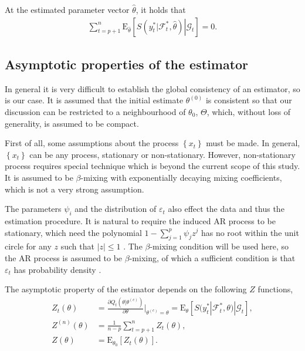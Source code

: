 \documentclass[a4paper,12pt]{article}
\newcommand{\E}{\mathop{\mathbb{E}}}
\def \E{\mbox{E}}
\def \F {\mathcal{F}}
\def \G {\mathcal{G}}
\begin{document}
At the estimated parameter vector $\hat{\theta}$, it holds that
\begin{align}
\sum_{t=p+1}^n \E_{\hat{\theta}}\left[ \left. S(y_t^*|\F_t^*,\hat{\theta}) \right|\G_t \right]= 0.
\label{hatEqn}
\end{align}

\subsection{Asymptotic properties of the estimator}
In general it is very difficult to establish the global consistency of an estimator, so is our case. It is assumed that the initial estimate $\theta^{(0)}$ is consistent so that our discussion can be restricted to a neighbourhood of $\theta_0$, $\Theta$, which, without loss of generality, is assumed to be compact.

First of all, some assumptions about the process $\left\{ x_t \right\}$ must be made. In general, $\left\{ x_t \right\}$ can be any process, stationary or non-stationary. However, non-stationary process requires special technique which is beyond the current scope of this study. It is assumed to be $\beta$-mixing with exponentially decaying mixing coefficients, which is not a very strong assumption.

The parameters $\psi_i$ and the distribution of $\varepsilon_t$ also effect the data and thus the estimation procedure. It is natural to require the induced AR process to be stationary, which need the polynomial $1-\sum_{j=1}^p \psi_jz^j$ has no root within the unit circle for any $z$ such that $|z|\le 1$ \citep{FanYao2003}. The $\beta$-mixing condition will be used here, so the AR process is assumed to be $\beta$-mixing, of which a sufficient condition is that $\varepsilon_t$ has probability density \citep{PhamTran1985}.

The asymptotic property of the estimator depends on the following $Z$ functions,
\begin{align*}
Z_t(\theta) &= \frac{\partial Q_t(\theta|\theta^{(c)})}{\partial \theta}|_{\theta^{(c)}=\theta} =
\E_{\theta}\left[ S(y_t^*|\F_t^*,\theta)|\G_t \right],\\
Z^{(n)}(\theta) &= \frac{1}{n-p}\sum_{t=p+1}^n Z_t(\theta),\\
Z(\theta) &= \E_{\theta_0}\left[ Z_t(\theta) \right].
\end{align*}
\end{document}
